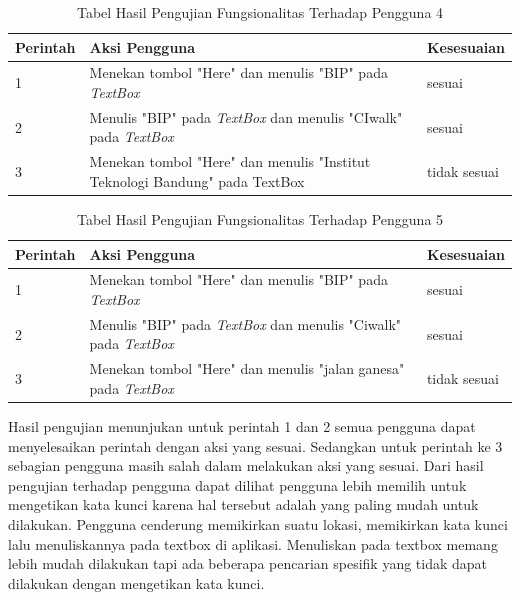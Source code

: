 \begin{table}[h!]
	\centering
		\begin{tabular}{|p{}|p{9cm}|p{2cm}|}\hline
				Perintah & Aksi Pengguna & Kesesuaian \\ \hline
				1 & Menekan tombol "Here" dan menulis "BIP" pada \textit{TextBox} & sesuai \\ \hline
				2 & Menulis "BIP" pada \textit{TextBox} dan menulis "CIwalk" pada \textit{TextBox} & sesuai \\ \hline
				3 & Menekan tombol "Here" dan menulis "Institut Teknologi Bandung" pada TextBox & tidak sesuai \\ \hline
		\end{tabular}
	\caption{Tabel Hasil Pengujian Fungsionalitas Terhadap Pengguna 4}
	\label{tab:TabelHasilPengujianFungsionalitasTerhadapPengguna}
\end{table}

\begin{table}[h!]
	\centering
		\begin{tabular}{|p{}|p{9cm}|p{2cm}|}\hline
				Perintah & Aksi Pengguna & Kesesuaian \\ \hline
				1 & Menekan tombol "Here" dan menulis "BIP" pada \textit{TextBox} & sesuai \\ \hline
				2 & Menulis "BIP" pada \textit{TextBox} dan menulis "Ciwalk" pada \textit{TextBox} & sesuai \\ \hline
				3 & Menekan tombol "Here" dan menulis "jalan ganesa" pada \textit{TextBox} & tidak sesuai \\ \hline
		\end{tabular}
	\caption{Tabel Hasil Pengujian Fungsionalitas Terhadap Pengguna 5}
	\label{tab:TabelHasilPengujianFungsionalitasTerhadapPengguna}
\end{table}

\hspace{0.5cm} Hasil pengujian menunjukan untuk perintah 1 dan 2 semua pengguna dapat menyelesaikan perintah dengan aksi yang sesuai. Sedangkan untuk perintah ke 3 sebagian pengguna masih salah dalam melakukan aksi yang sesuai. Dari hasil pengujian terhadap pengguna dapat dilihat pengguna lebih memilih untuk mengetikan kata kunci karena hal tersebut adalah yang paling mudah untuk dilakukan. Pengguna cenderung memikirkan suatu lokasi, memikirkan kata kunci lalu menuliskannya pada textbox di aplikasi. Menuliskan pada textbox memang lebih mudah dilakukan tapi ada beberapa pencarian spesifik yang tidak dapat dilakukan dengan mengetikan kata kunci.   

